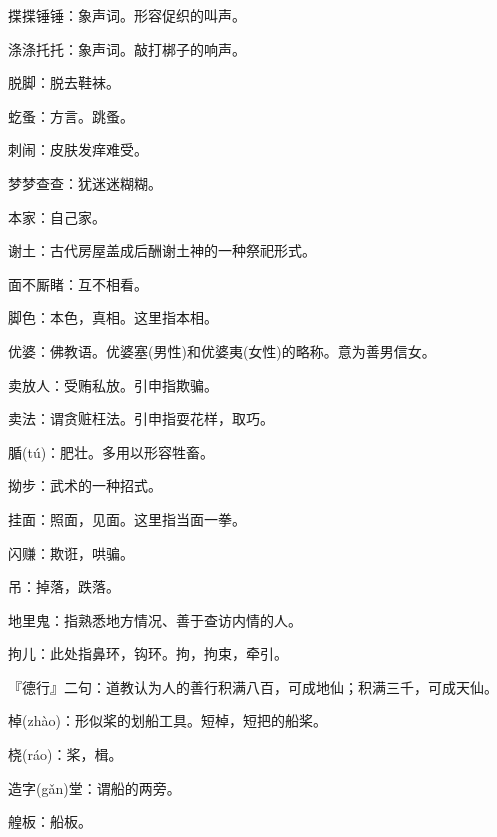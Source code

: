 \startbuffer[1605]
揲揲锤锤：象声词。形容促织的叫声。
\stopbuffer


\startbuffer[1606]
涤涤托托：象声词。敲打梆子的响声。
\stopbuffer


\startbuffer[1607]
脱脚：脱去鞋袜。
\stopbuffer


\startbuffer[1608]
虼蚤：方言。跳蚤。
\stopbuffer


\startbuffer[1609]
刺闹：皮肤发痒难受。
\stopbuffer


\startbuffer[1610]
梦梦查查：犹迷迷糊糊。
\stopbuffer


\startbuffer[1611]
本家：自己家。
\stopbuffer


\startbuffer[1612]
谢土：古代房屋盖成后酬谢土神的一种祭祀形式。
\stopbuffer


\startbuffer[1613]
面不厮睹：互不相看。
\stopbuffer


\startbuffer[1614]
脚色：本色，真相。这里指本相。
\stopbuffer


\startbuffer[1615]
优婆：佛教语。优婆塞(男性)和优婆夷(女性)的略称。意为善男信女。
\stopbuffer


\startbuffer[1616]
卖放人：受贿私放。引申指欺骗。
\stopbuffer


\startbuffer[1617]
卖法：谓贪赃枉法。引申指耍花样，取巧。
\stopbuffer


\startbuffer[1618]
腯(tú)：肥壮。多用以形容牲畜。
\stopbuffer


\startbuffer[1619]
拗步：武术的一种招式。
\stopbuffer


\startbuffer[1620]
挂面：照面，见面。这里指当面一拳。
\stopbuffer


\startbuffer[1621]
闪赚：欺诳，哄骗。
\stopbuffer


\startbuffer[1622]
吊：掉落，跌落。
\stopbuffer


\startbuffer[1623]
地里鬼：指熟悉地方情况、善于查访内情的人。
\stopbuffer


\startbuffer[1624]
拘儿：此处指鼻环，钩环。拘，拘束，牵引。
\stopbuffer


\startbuffer[1625]
『德行』二句：道教认为人的善行积满八百，可成地仙；积满三千，可成天仙。
\stopbuffer


\startbuffer[1626]
棹(zhào)：形似桨的划船工具。短棹，短把的船桨。
\stopbuffer


\startbuffer[1627]
桡(ráo)：桨，楫。
\stopbuffer


\startbuffer[1628]
造字(gǎn)堂：谓船的两旁。
\stopbuffer


\startbuffer[1629]
艎板：船板。
\stopbuffer


